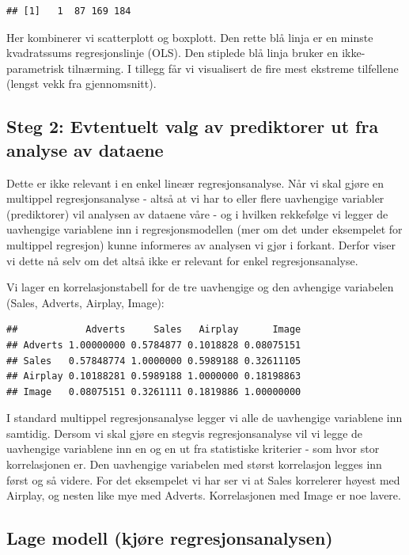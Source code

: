 \documentclass[
]{article}
\begin{document}
\begin{verbatim}
## [1]   1  87 169 184
\end{verbatim}

Her kombinerer vi scatterplott og boxplott. Den rette blå linja er en
minste kvadratssums regresjonslinje (OLS). Den stiplede blå linja bruker
en ikke-parametrisk tilnærming. I tillegg får vi visualisert de fire
mest ekstreme tilfellene (lengst vekk fra gjennomsnitt).

\hypertarget{steg-2-evtentuelt-valg-av-prediktorer-ut-fra-analyse-av-dataene}{%
\subsection{Steg 2: Evtentuelt valg av prediktorer ut fra analyse av
dataene}\label{steg-2-evtentuelt-valg-av-prediktorer-ut-fra-analyse-av-dataene}}

Dette er ikke relevant i en enkel lineær regresjonsanalyse. Når vi skal
gjøre en multippel regresjonsanalyse - altså at vi har to eller flere
uavhengige variabler (prediktorer) vil analysen av dataene våre - og i
hvilken rekkefølge vi legger de uavhengige variablene inn i
regresjonsmodellen (mer om det under eksempelet for multippel regresjon)
kunne informeres av analysen vi gjør i forkant. Derfor viser vi dette nå
selv om det altså ikke er relevant for enkel regresjonsanalyse.

Vi lager en korrelasjonstabell for de tre uavhengige og den avhengige
variabelen (Sales, Adverts, Airplay, Image):

\begin{verbatim}
##            Adverts     Sales   Airplay      Image
## Adverts 1.00000000 0.5784877 0.1018828 0.08075151
## Sales   0.57848774 1.0000000 0.5989188 0.32611105
## Airplay 0.10188281 0.5989188 1.0000000 0.18198863
## Image   0.08075151 0.3261111 0.1819886 1.00000000
\end{verbatim}

I standard multippel regresjonsanalyse legger vi alle de uavhengige
variablene inn samtidig. Dersom vi skal gjøre en stegvis
regresjonsanalyse vil vi legge de uavhengige variablene inn en og en ut
fra statistiske kriterier - som hvor stor korrelasjonen er. Den
uavhengige variabelen med størst korrelasjon legges inn først og så
videre. For det eksempelet vi har ser vi at Sales korrelerer høyest med
Airplay, og nesten like mye med Adverts. Korrelasjonen med Image er noe
lavere.

\hypertarget{lage-modell-kjuxf8re-regresjonsanalysen}{%
\subsection{Lage modell (kjøre
regresjonsanalysen)}\label{lage-modell-kjuxf8re-regresjonsanalysen}}
\end{document}
